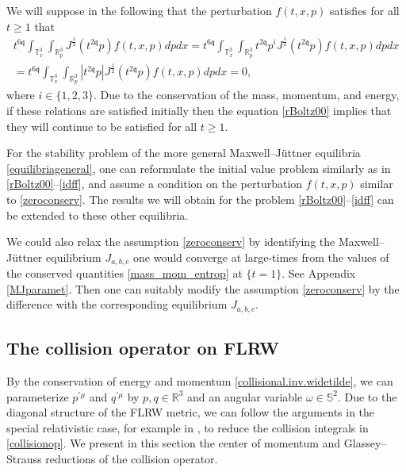 \documentclass[reqno]{amsart}
\newcommand{\pv}{p}
\newcommand{\qv}{q}
\newcommand{\qq}{\mathfrak{q}}
\newcommand{\tqq}{t^{2\qq}}
\theoremstyle{definition}
\numberwithin{equation}{section}
\numberwithin{theorem}{section}
\begin{document}
 

We will suppose in the following that the perturbation \(f(t,x,p)\) satisfies for all \(t\geq 1\) that
\begin{multline}\label{zeroconserv}
           t^{6\qq} \int_{\mathbb{T}^3_x}\int_{ \mathbb{R}^3_p}   J^{\frac{1}{2}}(\tqq \pv)f(t,x,\pv)d\pv dx=    t^{6\qq} \int_{\mathbb{T}^3_x}\int_{ \mathbb{R}^3_p} \tqq p^i  J^{\frac{1}{2}}(\tqq \pv)f(t,x,\pv)d\pv dx
       \\ 
       =   t^{6\qq} \int_{\mathbb{T}^3_x}\int_{ \mathbb{R}^3_p}  |\tqq \pv| J^{\frac{1}{2}}(\tqq \pv)f(t,x,\pv)d\pv dx=0,
\end{multline}
where \(i\in \{1,2,3\}\). Due to the conservation of the mass, momentum, and energy, if these relations are satisfied initially then the equation \eqref{rBoltz00} implies that they will continue to be satisfied for all \(t \geq 1\).


For the stability problem of the more general Maxwell--J\"uttner equilibria \eqref{equilibriageneral}, one can reformulate the initial value problem similarly as in \eqref{rBoltz00}--\eqref{idff}, and assume a condition on the perturbation \(f(t,x,p)\) similar to \eqref{zeroconserv}. The results we will obtain for the problem \eqref{rBoltz00}--\eqref{idff} can be extended to these other equilibria. 

We could also relax the assumption \eqref{zeroconserv} by identifying the Maxwell--J\"uttner equilibrium \(J_{a,b,c}\) one would converge at large-times from the values of the conserved quantities \eqref{mass_mom_entrop} at \(\{t=1\}\). See Appendix \ref{MJparamet}. Then one can suitably modify the assumption \eqref{zeroconserv} by the difference with the corresponding equilibrium \(J_{a,b,c}\).













\subsection{The collision operator on FLRW}\label{sec:FLRWcoll}



By the  conservation of energy and momentum \eqref{collisional.inv.widetilde}, we can parameterize ${\pv}^{\prime\mu}$ and ${\qv}^{\prime\mu}$ by ${\pv}, {\qv} \in \mathbb{R}^3$ and an angular variable $\omega\in \mathbb{S}^2$. Due to the diagonal structure of the FLRW metric, we can follow the arguments in the special relativistic case, for example in \cite{MR2765751}, to reduce the collision integrals in \eqref{collisionop}. We present in this section the center of momentum and Glassey--Strauss reductions of the collision operator. 
\end{document}
